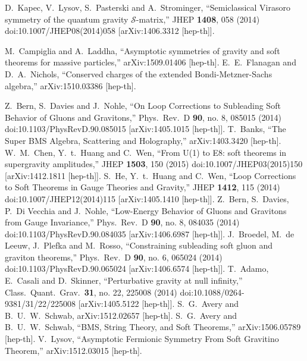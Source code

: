 \documentclass[12pt]{article}
\numberwithin{equation}{section}
\begin{document}
\begin{thebibliography}{99}
  D.~Kapec, V.~Lysov, S.~Pasterski and A.~Strominger,
  ``Semiclassical Virasoro symmetry of the quantum gravity $ \mathcal{S}$-matrix,''
  JHEP {\bf 1408}, 058 (2014)
  doi:10.1007/JHEP08(2014)058
  [arXiv:1406.3312 [hep-th]].

  M.~Campiglia and A.~Laddha,
  ``Asymptotic symmetries of gravity and soft theorems for massive particles,''
  arXiv:1509.01406 [hep-th].
  E.~E.~Flanagan and D.~A.~Nichols,
  ``Conserved charges of the extended Bondi-Metzner-Sachs algebra,''
  arXiv:1510.03386 [hep-th].
  
 
  Z.~Bern, S.~Davies and J.~Nohle,
  ``On Loop Corrections to Subleading Soft Behavior of Gluons and Gravitons,''
  Phys.\ Rev.\ D {\bf 90}, no. 8, 085015 (2014)
  doi:10.1103/PhysRevD.90.085015
  [arXiv:1405.1015 [hep-th]].
  T.~Banks,
  ``The Super BMS Algebra, Scattering and Holography,''
  arXiv:1403.3420 [hep-th].
  W.~M.~Chen, Y.~t.~Huang and C.~Wen,
  ``From U(1) to E8: soft theorems in supergravity amplitudes,''
  JHEP {\bf 1503}, 150 (2015)
  doi:10.1007/JHEP03(2015)150
  [arXiv:1412.1811 [hep-th]].
  S.~He, Y.~t.~Huang and C.~Wen,
 ``Loop Corrections to Soft Theorems in Gauge Theories and Gravity,''
  JHEP {\bf 1412}, 115 (2014)
  doi:10.1007/JHEP12(2014)115
  [arXiv:1405.1410 [hep-th]].
  Z.~Bern, S.~Davies, P.~Di Vecchia and J.~Nohle,
  ``Low-Energy Behavior of Gluons and Gravitons from Gauge Invariance,''
  Phys.\ Rev.\ D {\bf 90}, no. 8, 084035 (2014)
  doi:10.1103/PhysRevD.90.084035
  [arXiv:1406.6987 [hep-th]].
  J.~Broedel, M.~de Leeuw, J.~Plefka and M.~Rosso,
  ``Constraining subleading soft gluon and graviton theorems,''
  Phys.\ Rev.\ D {\bf 90}, no. 6, 065024 (2014)
  doi:10.1103/PhysRevD.90.065024
  [arXiv:1406.6574 [hep-th]].
  T.~Adamo, E.~Casali and D.~Skinner,
  ``Perturbative gravity at null infinity,''
  Class.\ Quant.\ Grav.\  {\bf 31}, no. 22, 225008 (2014)
  doi:10.1088/0264-9381/31/22/225008
  [arXiv:1405.5122 [hep-th]].
  S.~G.~Avery and B.~U.~W.~Schwab,
  arXiv:1512.02657 [hep-th].
  S.~G.~Avery and B.~U.~W.~Schwab,
  ``BMS, String Theory, and Soft Theorems,''
  arXiv:1506.05789 [hep-th].
  V.~Lysov,
  ``Asymptotic Fermionic Symmetry From Soft Gravitino Theorem,''
  arXiv:1512.03015 [hep-th].


\end{thebibliography}
\end{document}
